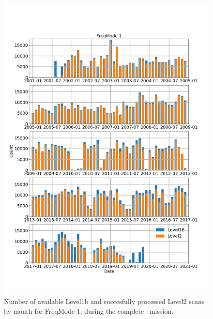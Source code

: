 \begin{figure}[t]
\centering
\includegraphics[width=1.0\textwidth]{l2cad-fm1.png}
\caption{Number of available Level1b and succesfully processed Level2
scans by month for FreqMode 1, during the complete \smr\ mission.}
\label{fig:l2cad-fm1}
\end{figure}

